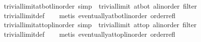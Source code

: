 \begin{isabellebody}
\isanewline
%
\endisadelimproof
\isanewline
{}\isamarkupfalse%
\ trivial{\isacharunderscore}{\kern0pt}limit{\isacharunderscore}{\kern0pt}at{\isacharunderscore}{\kern0pt}bot{\isacharunderscore}{\kern0pt}linorder\ {\isacharbrackleft}{\kern0pt}simp{\isacharbrackright}{\kern0pt}{\isacharcolon}{\kern0pt}\ {\isachardoublequoteopen}{\isasymnot}\ trivial{\isacharunderscore}{\kern0pt}limit\ {\isacharparenleft}{\kern0pt}at{\isacharunderscore}{\kern0pt}bot\ {\isacharcolon}{\kern0pt}{\isacharcolon}{\kern0pt}{\isacharparenleft}{\kern0pt}{\isacharprime}{\kern0pt}a{\isacharcolon}{\kern0pt}{\isacharcolon}{\kern0pt}linorder{\isacharparenright}{\kern0pt}\ filter{\isacharparenright}{\kern0pt}{\isachardoublequoteclose}\isanewline
%
\isadelimproof
\ \ %
\endisadelimproof
%
\isatagproof
{}\isamarkupfalse%
\ trivial{\isacharunderscore}{\kern0pt}limit{\isacharunderscore}{\kern0pt}def\isanewline
\ \ \isamarkupfalse%
\ {\isacharparenleft}{\kern0pt}metis\ eventually{\isacharunderscore}{\kern0pt}at{\isacharunderscore}{\kern0pt}bot{\isacharunderscore}{\kern0pt}linorder\ order{\isacharunderscore}{\kern0pt}refl{\isacharparenright}{\kern0pt}%
\endisatagproof
{\isafoldproof}%
%
\isadelimproof
\isanewline
%
\endisadelimproof
\isanewline
{}\isamarkupfalse%
\ trivial{\isacharunderscore}{\kern0pt}limit{\isacharunderscore}{\kern0pt}at{\isacharunderscore}{\kern0pt}top{\isacharunderscore}{\kern0pt}linorder\ {\isacharbrackleft}{\kern0pt}simp{\isacharbrackright}{\kern0pt}{\isacharcolon}{\kern0pt}\ {\isachardoublequoteopen}{\isasymnot}\ trivial{\isacharunderscore}{\kern0pt}limit\ {\isacharparenleft}{\kern0pt}at{\isacharunderscore}{\kern0pt}top\ {\isacharcolon}{\kern0pt}{\isacharcolon}{\kern0pt}{\isacharparenleft}{\kern0pt}{\isacharprime}{\kern0pt}a{\isacharcolon}{\kern0pt}{\isacharcolon}{\kern0pt}linorder{\isacharparenright}{\kern0pt}\ filter{\isacharparenright}{\kern0pt}{\isachardoublequoteclose}\isanewline
%
\isadelimproof
\ \ %
\endisadelimproof
%
\isatagproof
{}\isamarkupfalse%
\ trivial{\isacharunderscore}{\kern0pt}limit{\isacharunderscore}{\kern0pt}def\isanewline
\ \ \isamarkupfalse%
\ {\isacharparenleft}{\kern0pt}metis\ eventually{\isacharunderscore}{\kern0pt}at{\isacharunderscore}{\kern0pt}top{\isacharunderscore}{\kern0pt}linorder\ order{\isacharunderscore}{\kern0pt}refl{\isacharparenright}{\kern0pt}%
\endisatagproof
{\isafoldproof}%
%
\isadelimproof
%
\endisadelimproof
%
\isadelimdocument
%
\endisadelimdocument
%
\isatagdocument
%
\isamarkuptrue%
%
\endisatagdocument

\end{isabellebody}
